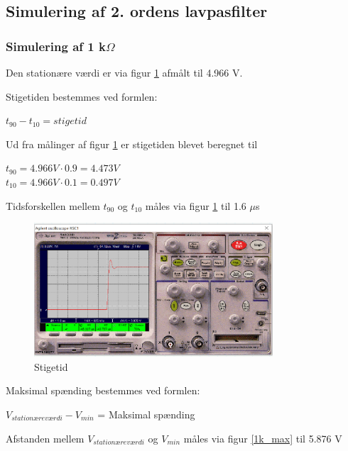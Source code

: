 \subsection{Simulering af 2. ordens lavpasfilter}

\subsubsection{Simulering af 1 k$\Omega$ }
Den stationære værdi er via figur \ref{1k.stigetid} afmålt til 4.966 V.

Stigetiden bestemmes ved formlen:
\begin{center}
$t_{90} - t_{10} = stigetid$
\end{center}

Ud fra målinger af figur \ref{1k.stigetid} er stigetiden blevet beregnet til

\begin{center}
$t_{90} = 4.966 V \cdot 0.9 = 4.473 V$
\\ 
$t_{10} = 4.966 V \cdot 0.1 = 0.497 V$
\end{center}

Tidsforskellen mellem $t_{90}$ og $t_{10}$ måles via figur \ref{1k.stigetid} til 1.6 $\mu$s

\begin{figure}[h]
 \begin{center}
  \includegraphics[height=5cm]{P_Fig/figur8_1k_stigetid}
  \caption{Stigetid}
  \label{1k.stigetid}
 \end{center}
\end{figure}

Maksimal spænding bestemmes ved formlen:
\begin{center}
$V_{stationæreværdi} - V_{min}$ = Maksimal spænding
\end{center}

Afstanden mellem $V_{stationæreværdi}$ og $V_{min}$ måles via figur \ref{1k_max} til 5.876 V

